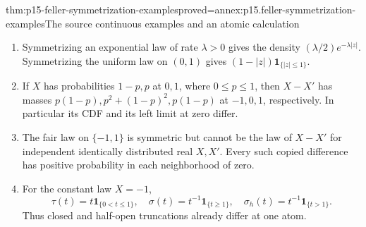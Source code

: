 \begin{hbtheorem}{thm:p15-feller-symmetrization-examples}{proved=annex:p15.feller-symmetrization-examples}{The source continuous examples and an atomic calculation}
\begin{enumerate}
\item Symmetrizing an exponential law of rate \(\lambda>0\) gives
the density \((\lambda/2)e^{-\lambda|z|}\).
Symmetrizing the uniform law on \((0,1)\) gives
\((1-|z|)\mathbf1_{\{|z|\leq1\}}\).
\item If \(X\) has probabilities \(1-p,p\) at \(0,1\), where
\(0\leq p\leq1\), then \(X-X'\) has masses
\(p(1-p),p^2+(1-p)^2,p(1-p)\) at \(-1,0,1\), respectively.
In particular its CDF and its left limit at zero differ.
\item The fair law on \(\{-1,1\}\) is symmetric but cannot be
the law of \(X-X'\) for independent identically distributed real
\(X,X'\). Every such copied difference has positive probability
in each neighborhood of zero.
\item For the constant law \(X=-1\),
\[
 \tau(t)=t\mathbf1_{\{0<t\leq1\}},\quad
 \sigma(t)=t^{-1}\mathbf1_{\{t\geq1\}},\quad
 \sigma_h(t)=t^{-1}\mathbf1_{\{t>1\}}.
\]
Thus closed and half-open truncations already differ at one atom.
\end{enumerate}
\end{hbtheorem}

